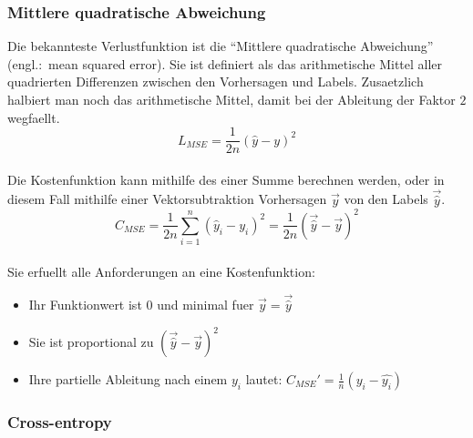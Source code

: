 \subsubsection{Mittlere quadratische Abweichung}
Die bekannteste Verlustfunktion ist die ``Mittlere quadratische Abweichung''
(engl.:\ mean squared error). Sie ist definiert als das arithmetische Mittel
aller quadrierten Differenzen zwischen den Vorhersagen und Labels.
Zusaetzlich halbiert man noch das arithmetische Mittel, damit bei der Ableitung der Faktor
$2$ wegfaellt.
\\
\begin{equation}\label{eq:MSE}
  L_{MSE} = \frac{1}{2n}{(\hat{y} - y)}^2
\end{equation}
\\
Die Kostenfunktion kann mithilfe des einer Summe berechnen werden, oder in
diesem Fall mithilfe einer Vektorsubtraktion Vorhersagen $\vec{y}$ von den Labels $\vec{\hat{y}}$.
\\
\begin{equation}\label{eq:MSE}
  C_{MSE} = \frac{1}{2n}\sum_{i=1}^{n}{(\hat{y}_i - y_i)}^2 = \frac{1}{2n}{(\vec{\hat{y}} - \vec{y})}^2
\end{equation}
\\
Sie erfuellt alle Anforderungen an eine Kostenfunktion:
\begin{itemize}
\item{Ihr Funktionwert ist 0 und minimal fuer $\vec{y} = \vec{\hat{y}}$}
\item{Sie ist proportional zu ${(\vec{\hat{y}}-\vec{y})}^2$}
\item{Ihre partielle Ableitung nach einem $y_i$ lautet: $C_{MSE}'=\frac{1}{n}(y_i-\hat{y_i})$}
\end{itemize}


\subsubsection{Cross-entropy}



